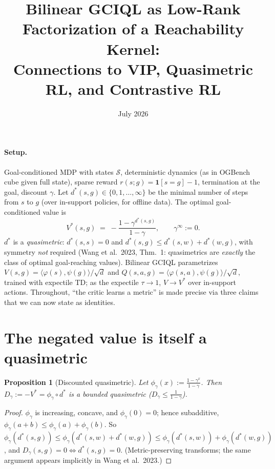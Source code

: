 \documentclass[10pt]{article}
\title{\vspace{-2em}Bilinear GCIQL as Low-Rank Factorization of a Reachability Kernel:\\
Connections to VIP, Quasimetric RL, and Contrastive RL}
\author{}
\date{July 2026}
\newtheorem{proposition}{Proposition}
\newcommand{\ip}[2]{\langle #1, #2 \rangle}
\begin{document}
\maketitle
\vspace{-3em}

\paragraph{Setup.}
Goal-conditioned MDP with states $\mathcal{S}$, deterministic dynamics (as in OGBench cube given full state), sparse reward $r(s;g) = \mathbf{1}[s{=}g] - 1$, termination at the goal, discount $\gamma$. Let $d^*(s,g) \in \{0,1,\dots,\infty\}$ be the minimal number of steps from $s$ to $g$ (over in-support policies, for offline data). The optimal goal-conditioned value is
\begin{equation}
V^*(s,g) \;=\; -\frac{1-\gamma^{d^*(s,g)}}{1-\gamma}, \qquad \gamma^{\infty} := 0 .
\label{eq:vstar}
\end{equation}
$d^*$ is a \emph{quasimetric}: $d^*(s,s)=0$ and $d^*(s,g) \le d^*(s,w) + d^*(w,g)$, with symmetry \emph{not} required (Wang et al.\ 2023, Thm.~1: quasimetrics are \emph{exactly} the class of optimal goal-reaching values). Bilinear GCIQL parametrizes $V(s,g) = \ip{\varphi(s)}{\psi(g)}/\sqrt{d}$ and $Q(s,a,g)=\ip{\varphi(s,a)}{\psi(g)}/\sqrt{d}$, trained with expectile TD; as the expectile $\tau \to 1$, $V \to V^*$ over in-support actions. Throughout, ``the critic learns a metric'' is made precise via three claims that we can now state as identities.

\section{The negated value is itself a quasimetric}

\begin{proposition}[Discounted quasimetric]\label{prop:qm}
Let $\phi_\gamma(x) := \frac{1-\gamma^{x}}{1-\gamma}$. Then $D_\gamma := -V^* = \phi_\gamma \circ d^*$ is a bounded quasimetric ($D_\gamma \le \tfrac{1}{1-\gamma}$).
\end{proposition}
\begin{proof}
$\phi_\gamma$ is increasing, concave, and $\phi_\gamma(0)=0$; hence subadditive, $\phi_\gamma(a+b)\le\phi_\gamma(a)+\phi_\gamma(b)$. So
$\phi_\gamma(d^*(s,g)) \le \phi_\gamma(d^*(s,w)+d^*(w,g)) \le \phi_\gamma(d^*(s,w))+\phi_\gamma(d^*(w,g))$, and $D_\gamma(s,g)=0 \iff d^*(s,g)=0$. (Metric-preserving transforms; the same argument appears implicitly in Wang et al.\ 2023.)
\end{proof}
\end{document}
